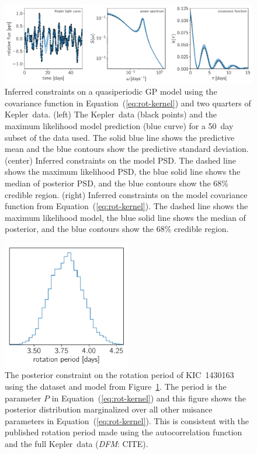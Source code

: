 \documentclass[manuscript, letterpaper]{aastex6}
\newcommand{\project}[1]{\textsf{#1}}
\newcommand{\kepler}{\project{Kepler}}
\newcommand{\figureref}[1]{\ref{fig:#1}}
\newcommand{\Figure}[1]{Figure~\figureref{#1}}
\newcommand{\figurelabel}[1]{\label{fig:#1}}
\renewcommand{\eqref}[1]{\ref{eq:#1}}
\newcommand{\Eq}[1]{Equation~(\eqref{#1})}
\newcommand{\eq}[1]{\Eq{#1}}
\newcommand{\todo}[3]{{\color{#2}\emph{#1}: #3}}
\newcommand{\dfmtodo}[1]{\todo{DFM}{red}{#1}}
\begin{document}
\begin{figure}[!htbp]
\begin{center}
\includegraphics[width=\textwidth]{figures/rotation.pdf}
\caption{Inferred constraints on a quasiperiodic GP model using the covariance
    function in \eq{rot-kernel} and two quarters of \kepler\ data.
(left) The \kepler\ data (black points) and the maximum likelihood model
    prediction (blue curve) for a 50~day subset of the data used.
    The solid blue line shows the predictive mean and the blue contours show
    the predictive standard deviation.
(center) Inferred constraints on the model PSD.
    The dashed line shows the maximum likelihood PSD, the blue solid line
    shows the median of posterior PSD, and the blue contours show the 68\%
    credible region.
(right) Inferred constraints on the model covariance function from
    \eq{rot-kernel}.
    The dashed line shows the maximum likelihood model, the blue solid line
    shows the median of posterior, and the blue contours show the 68\%
    credible region.
    \figurelabel{rotation}}
\end{center}
\end{figure}

\begin{figure}[!htbp]
\begin{center}
\includegraphics[width=0.5\textwidth]{figures/rotation-period.pdf}
\caption{The posterior constraint on the rotation period of KIC~1430163 using
    the dataset and model from \Figure{rotation}.
    The period is the parameter $P$ in \eq{rot-kernel} and this figure shows
    the posterior distribution marginalized over all other nuisance parameters
    in \eq{rot-kernel}.
    This is consistent with the published rotation period made using the
    autocorrelation function and the full \kepler\ data (\dfmtodo{CITE}).
    \figurelabel{rotation-period}}
\end{center}
\end{figure}
\end{document}
